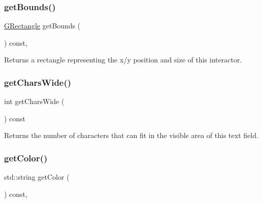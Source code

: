 \mbox{\label{classGInteractor_a29e6ac35a0b48f491a4c88194cc5da3b}} 
\subsubsection{\texorpdfstring{get\+Bounds()}{getBounds()}}
{\footnotesize\ttfamily \mbox{\hyperlink{classGRectangle}{G\+Rectangle}} get\+Bounds (\begin{DoxyParamCaption}{ }\end{DoxyParamCaption}) const\hspace{0.3cm}{\ttfamily [virtual]}, {\ttfamily [inherited]}}



Returns a rectangle representing the x/y position and size of this interactor. 

\mbox{\label{classGTextField_acccdf98a090bca28752d04519a8b1a28}} 
\subsubsection{\texorpdfstring{get\+Chars\+Wide()}{getCharsWide()}}
{\footnotesize\ttfamily int get\+Chars\+Wide (\begin{DoxyParamCaption}{ }\end{DoxyParamCaption}) const\hspace{0.3cm}{\ttfamily [virtual]}}



Returns the number of characters that can fit in the visible area of this text field. 

\mbox{\label{classGInteractor_aa061dfa488c31e18549d64363c1d0e34}} 
\subsubsection{\texorpdfstring{get\+Color()}{getColor()}}
{\footnotesize\ttfamily std\+::string get\+Color (\begin{DoxyParamCaption}{ }\end{DoxyParamCaption}) const\hspace{0.3cm}{\ttfamily [virtual]}, {\ttfamily [inherited]}}



